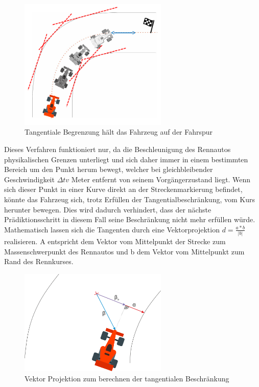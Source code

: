 \documentclass{like}
\begin{document}
\begin{figure}[ht!]
	\centering
	\includegraphics[width=200pt]{Abbildungen/tangentialConstraint.png}
	\caption{Tangentiale Begrenzung hält das Fahrzeug auf der Fahrspur}
	\label{fig:costGoalDist}
\end{figure}
Dieses Verfahren funktioniert nur, da die Beschleunigung des Rennautos physikalischen Grenzen unterliegt und sich daher immer in einem bestimmten Bereich um den Punkt herum bewegt, welcher bei gleichbleibender Geschwindigkeit $\Delta t v$ Meter entfernt von seinem Vorgängerzustand liegt. Wenn sich dieser Punkt in einer Kurve direkt an der Streckenmarkierung befindet, könnte das Fahrzeug sich, trotz Erfüllen der Tangentialbeschränkung, vom Kurs herunter bewegen. Dies wird dadurch verhindert, dass der nächste Prädiktionsschritt in diesem Fall seine Beschränkung nicht mehr erfüllen würde.
Mathematisch lassen sich die Tangenten durch eine Vektorprojektion $d = \frac{a*b}{|b|}$ realisieren. A entspricht dem Vektor vom Mittelpunkt der Strecke zum Massenschwerpunkt des Rennautos und b dem Vektor vom Mittelpunkt zum Rand des Rennkurses. 

\begin{figure}[ht!]
	\centering
	\includegraphics[width=200pt]{Abbildungen/vektorProjection.png}
	\caption{Vektor Projektion zum berechnen der tangentialen Beschränkung}
	\label{fig:vektorProjektion}
\end{figure}
\end{document}

